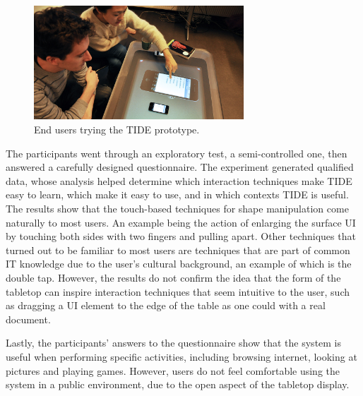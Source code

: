 \begin{figure}[htb]
  \centering
    \includegraphics[width=0.7\textwidth]{images/368}
  \caption{End users trying the TIDE prototype.}
  \label{fig:368}
\end{figure}

The participants went through an exploratory test, a semi-controlled one, then answered a carefully designed questionnaire. The experiment generated qualified data, whose analysis helped determine which interaction techniques make TIDE easy to learn, which make it easy to use, and in which contexts TIDE is useful.
The results show that the touch-based techniques for shape manipulation come naturally to most users.
An example being the action of enlarging the surface UI by touching both sides with two fingers and pulling apart.
Other techniques that turned out to be familiar to most users are techniques that are part of common IT knowledge due to the user's cultural background, an example of which is the double tap.
However, the results do not confirm the idea that the form of the tabletop can inspire interaction techniques that seem intuitive to the user, such as dragging a UI element to the edge of the table as one could with a real document.

Lastly, the participants' answers to the questionnaire show that the system is useful when performing specific activities, including browsing internet, looking at pictures and playing games.
However, users do not feel comfortable using the system in a public environment, due to the open aspect of the tabletop display.

%

